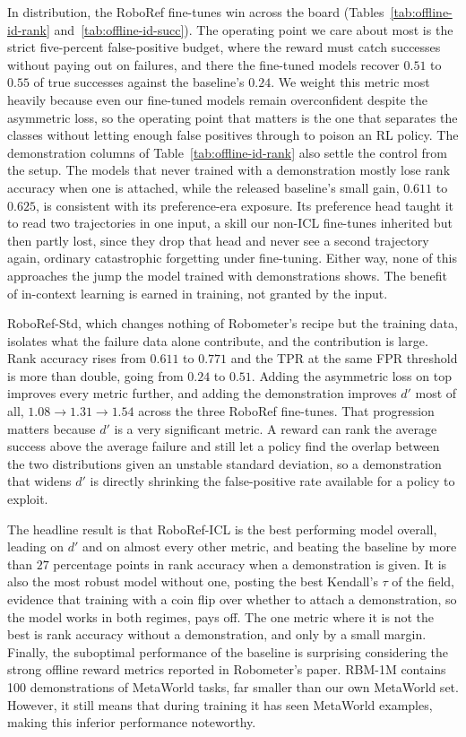 In distribution, the RoboRef fine-tunes win across the board (Tables~\ref{tab:offline-id-rank} and~\ref{tab:offline-id-succ}). The operating point we care about most is the strict five-percent false-positive budget, where the reward must catch successes without paying out on failures, and there the fine-tuned models recover $0.51$ to $0.55$ of true successes against the baseline's $0.24$. We weight this metric most heavily because even our fine-tuned models remain overconfident despite the asymmetric loss, so the operating point that matters is the one that separates the classes without letting enough false positives through to poison an RL policy. The demonstration columns of Table~\ref{tab:offline-id-rank} also settle the control from the setup. The models that never trained with a demonstration mostly lose rank accuracy when one is attached, while the released baseline's small gain, $0.611$ to $0.625$, is consistent with its preference-era exposure. Its preference head taught it to read two trajectories in one input, a skill our non-ICL fine-tunes inherited but then partly lost, since they drop that head and never see a second trajectory again, ordinary catastrophic forgetting under fine-tuning. Either way, none of this approaches the jump the model trained with demonstrations shows. The benefit of in-context learning is earned in training, not granted by the input.

RoboRef-Std, which changes nothing of Robometer's recipe but the training data, isolates what the failure data alone contribute, and the contribution is large. Rank accuracy rises from $0.611$ to $0.771$ and the TPR at the same FPR threshold is more than double, going from $0.24$ to $0.51$. Adding the asymmetric loss on top improves every metric further, and adding the demonstration improves $d'$ most of all, $1.08 \to 1.31 \to 1.54$ across the three RoboRef fine-tunes. That progression matters because $d'$ is a very significant metric. A reward can rank the average success above the average failure and still let a policy find the overlap between the two distributions given an unstable standard deviation, so a demonstration that widens $d'$ is directly shrinking the false-positive rate available for a policy to exploit.

The headline result is that RoboRef-ICL is the best performing model overall, leading on $d'$ and on almost every other metric, and beating the baseline by more than $27$ percentage points in rank accuracy when a demonstration is given. It is also the most robust model without one, posting the best Kendall's $\tau$ of the field, evidence that training with a coin flip over whether to attach a demonstration, so the model works in both regimes, pays off. The one metric where it is not the best is rank accuracy without a demonstration, and only by a small margin. Finally, the suboptimal performance of the baseline is surprising considering the strong offline reward metrics reported in Robometer's paper. RBM-1M contains 100 demonstrations of MetaWorld tasks, far smaller than our own MetaWorld set. However, it still means that during training it has seen MetaWorld examples, making this inferior performance noteworthy.

